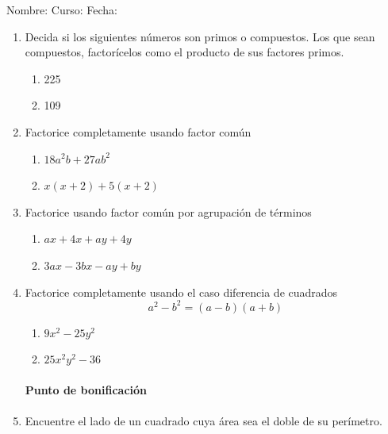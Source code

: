 \documentclass[letterpaper,fleqn]{article}
\newcommand{\LineaNombre}{%
\par
\vspace{\baselineskip}
Nombre:\hrulefill \; Curso: \underline{\hspace*{48pt}} \; Fecha: \underline{\hspace*{2.5cm}} \relax
\par}
\begin{document}
\LineaNombre
\begin{enumerate}
 \item Decida si los siguientes números son primos o compuestos. Los que sean compuestos, factorícelos como el producto de sus factores primos.
 \begin{enumerate}
 \item 225\noanswer
 \item 109 \noanswer
 \end{enumerate}
 \item Factorice completamente usando factor común
 \begin{enumerate}
 \item $18a^{2}b+27ab^{2}$\noanswer
 \item $x(x+2)+5(x+2)$\noanswer
 \end{enumerate}
 \item Factorice usando factor común por agrupación de términos
 \begin{enumerate}
 \item $ax+4x+ay+4y$\noanswer
 \item $3ax-3bx-ay+by$\noanswer
 \end{enumerate}
 \item Factorice completamente usando el caso diferencia de cuadrados
 \[a^{2}-b^{2}=(a-b)(a+b)\]
\begin{enumerate}
\item $9x^{2}-25y^{2}$\noanswer
\item $25x^{2}y^{2}-36$\noanswer
\end{enumerate}
\paragraph{Punto de bonificación}
\item Encuentre el lado de un cuadrado cuya área sea el doble de su perímetro.
 \end{enumerate}
\end{document}
